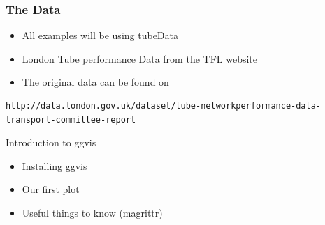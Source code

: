 \documentclass{beamer}
\begin{document}
\begin{frame}[fragile]
\frametitle{The Data}
\begin{itemize}
\item All examples will be using tubeData
\item London Tube performance Data from the TFL
website
\item The original data can be found on

\end{itemize}
\begin{verbatim}
http://data.london.gov.uk/dataset/tube-networkperformance-data-transport-committee-report

\end{verbatim}
\end{frame}
%  



\begin{frame}
	\huge
	Introduction to ggvis
	
	\begin{itemize}
		\item Installing ggvis
		\item Our first plot
		\item Useful things to know (magrittr)
	\end{itemize}
	
\end{frame}






\end{document}
